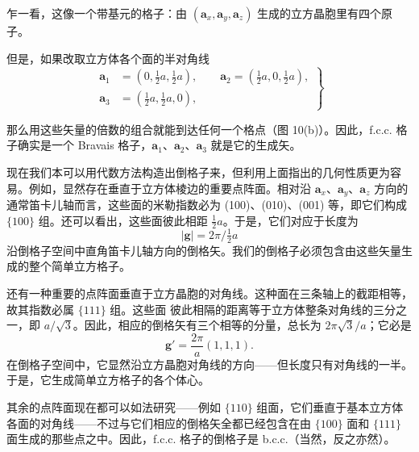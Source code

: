 乍一看，这像一个带基元的格子：由 $(\mathbf{a}_x,\mathbf{a}_y,\mathbf{a}_z)$ 生成的立方晶胞里有四个原子。

但是，如果改取立方体各个面的半对角线
\begin{equation*}
\left.
\begin{aligned}
\mathbf{a}_1 &= (0, \tfrac{1}{2}a, \tfrac{1}{2}a), \qquad
\mathbf{a}_2 = (\tfrac{1}{2}a, 0, \tfrac{1}{2}a), \\
\mathbf{a}_3 &= (\tfrac{1}{2}a, \tfrac{1}{2}a, 0),
\end{aligned}
\right\}
\tag{1.35}
\end{equation*}

那么用这些矢量的倍数的组合就能到达任何一个格点（图 10(b)）。因此，f.c.c. 格子确实是一个 Bravais 格子，$\mathbf{a}_1$、$\mathbf{a}_2$、$\mathbf{a}_3$ 就是它的生成矢。

现在我们本可以用代数方法构造出倒格子来，但利用上面指出的几何性质更为容易。例如，显然存在垂直于立方体棱边的重要点阵面。相对沿 $\mathbf{a}_x$、$\mathbf{a}_y$、$\mathbf{a}_z$ 方向的通常笛卡儿轴而言，这些面的米勒指数必为 (100)、(010)、(001) 等，即它们构成 $\{100\}$ 组。还可以看出，这些面彼此相距 $\tfrac{1}{2}a$。于是，它们对应于长度为
\begin{equation*}
|\boldsymbol{g}| = 2\pi/\tfrac{1}{2}a
\end{equation*}
沿倒格子空间中直角笛卡儿轴方向的倒格矢。我们的倒格子必须包含由这些矢量生成的整个简单立方格子。

还有一种重要的点阵面垂直于立方晶胞的对角线。这种面在三条轴上的截距相等，故其指数必属 $\{111\}$ 组。这些面
彼此相隔的距离等于立方体整条对角线的三分之一，即 $a/\sqrt{3}$。因此，相应的倒格矢有三个相等的分量，总长为 $2\pi\sqrt{3}/a$；它必是
\begin{equation*}
\boldsymbol{g}' = \frac{2\pi}{a}(1, 1, 1).
\tag{1.36}
\end{equation*}
在倒格子空间中，它显然沿立方晶胞对角线的方向——但长度只有对角线的一半。于是，它生成简单立方格子的各个体心。

其余的点阵面现在都可以如法研究——例如 $\{110\}$ 组面，它们垂直于基本立方体各面的对角线——不过与它们相应的倒格矢全都已经包含在由 $\{100\}$ 面和 $\{111\}$ 面生成的那些点之中。因此，f.c.c. 格子的倒格子是 b.c.c.（当然，反之亦然）。
